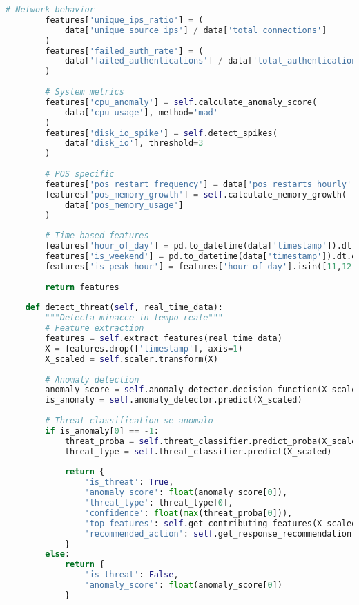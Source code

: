 \begin{lstlisting}[language=Python, caption=ML Pipeline per Threat Detection GDO]
        # Network behavior
        features['unique_ips_ratio'] = (
            data['unique_source_ips'] / data['total_connections']
        )
        features['failed_auth_rate'] = (
            data['failed_authentications'] / data['total_authentications']
        )
        
        # System metrics
        features['cpu_anomaly'] = self.calculate_anomaly_score(
            data['cpu_usage'], method='mad'
        )
        features['disk_io_spike'] = self.detect_spikes(
            data['disk_io'], threshold=3
        )
        
        # POS specific
        features['pos_restart_frequency'] = data['pos_restarts_hourly']
        features['pos_memory_growth'] = self.calculate_memory_growth(
            data['pos_memory_usage']
        )
        
        # Time-based features
        features['hour_of_day'] = pd.to_datetime(data['timestamp']).dt.hour
        features['is_weekend'] = pd.to_datetime(data['timestamp']).dt.dayofweek.isin([5,6])
        features['is_peak_hour'] = features['hour_of_day'].isin([11,12,13,18,19,20])
        
        return features
    
    def detect_threat(self, real_time_data):
        """Detecta minacce in tempo reale"""
        # Feature extraction
        features = self.extract_features(real_time_data)
        X = features.drop(['timestamp'], axis=1)
        X_scaled = self.scaler.transform(X)
        
        # Anomaly detection
        anomaly_score = self.anomaly_detector.decision_function(X_scaled)
        is_anomaly = self.anomaly_detector.predict(X_scaled)
        
        # Threat classification se anomalo
        if is_anomaly[0] == -1:
            threat_proba = self.threat_classifier.predict_proba(X_scaled)
            threat_type = self.threat_classifier.predict(X_scaled)
            
            return {
                'is_threat': True,
                'anomaly_score': float(anomaly_score[0]),
                'threat_type': threat_type[0],
                'confidence': float(max(threat_proba[0])),
                'top_features': self.get_contributing_features(X_scaled),
                'recommended_action': self.get_response_recommendation(threat_type[0])
            }
        else:
            return {
                'is_threat': False,
                'anomaly_score': float(anomaly_score[0])
            }
    

\end{lstlisting}
